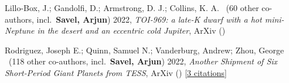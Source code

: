 \item[{\color{numcolor}\scriptsize2}] Lillo-Box, J.; Gandolfi, D.; Armstrong, D. J.; Collins, K. A. \etal \ ({60} other co-authors, incl.\ \textbf{Savel, Arjun}) 2022, \emph{TOI-969: a late-K dwarf with a hot mini-Neptune in the desert and an eccentric cold Jupiter}, ArXiv ()

\item[{\color{numcolor}\scriptsize1}] Rodriguez, Joseph E.; Quinn, Samuel N.; Vanderburg, Andrew; Zhou, George \etal \ ({118} other co-authors, incl.\ \textbf{Savel, Arjun}) 2022, \emph{Another Shipment of Six Short-Period Giant Planets from TESS}, ArXiv () [\href{https://ui.adsabs.harvard.edu/abs/2022arXiv220505709R}{3 citations}]
